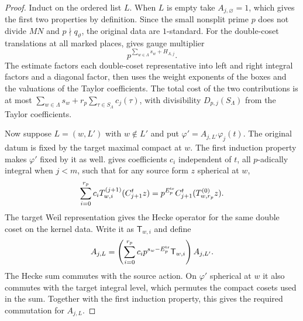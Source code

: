 \begin{proof}
Induct on the ordered list $L$. When $L$ is empty take $A_{j,\varnothing}=1$, which gives the first two properties by definition. Since the small nonsplit prime $p$ does not divide $MN$ and $p\nmid q_\vartheta$, the original data are $1$-standard. For the double-coset translations at all marked places,  gives gauge multiplier
\[
 p^{\sum_{w\in\Lambda}s_w+H_{\Lambda,j}} .
\]
The estimate factors each double-coset representative into left and right integral factors and a diagonal factor, then uses the weight exponents of the boxes and the valuations of the Taylor coefficients. The total cost of the two contributions is at most
$\sum_{w\in\Lambda}s_w+r_p\sum_{\tau\in S_\Lambda}c_j(\tau)$, with divisibility $D_{p,j}(S_\Lambda)$ from the Taylor coefficients.

Now suppose $L=(w,L')$ with $w\notin L'$ and put $\varphi'=A_{j,L'}\varphi_j(t)$. The original datum is fixed by the target maximal compact at $w$. The first induction property makes $\varphi'$ fixed by it as well.  gives coefficients $c_i$ independent of $t$, all $p$-adically integral when $j<m$, such that for any source form $z$ spherical at $w$,
\[
 \sum_{i=0}^{r_p}c_iT_{w,i}^{(j+1)}(C_{j+1}^t z)
   =p^{E_p^{\rm tr}}C_{j+1}^t(T_{w,r_p}^{(0)}z).
\]
The target Weil representation gives the Hecke operator for the same double coset on the kernel data. Write it as $\mathsf T_{w,i}$ and define
\[
 A_{j,L}
   =\left(\sum_{i=0}^{r_p}
       c_i p^{s_w-E_p^{\rm tr}}\mathsf T_{w,i}\right) A_{j,L'} .
\]
The Hecke sum commutes with the source action. On $\varphi'$ spherical at $w$ it also commutes with the target integral level, which permutes the compact cosets used in the sum. Together with the first induction property, this gives the required commutation for $A_{j,L}$.


\end{proof}
